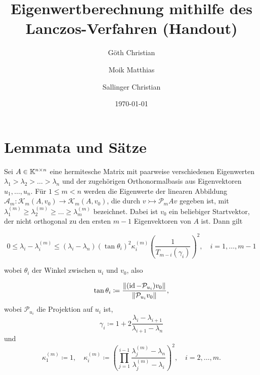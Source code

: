 \documentclass{article}
\begin{document}
\title
{
	Eigenwertberechnung mithilfe des Lanczos-Verfahren (Handout)
}
\author
{
	Göth Christian
	\and
	Moik Matthias
	\and
	Sallinger Christian
}
\date{\today}
\maketitle


\section{Lemmata und Sätze}

\begin{theorem}
	Sei $A \in \mathbb{K}^{n \times n}$ eine hermitesche Matrix mit paarweise verschiedenen Eigenwerten $\lambda_1 > \lambda_2 > \dots > \lambda_n$ und der zugehörigen Orthonormalbasis aus Eigenvektoren $u_1,\dots,u_n$. Für $1 \le m < n$ werden die Eigenwerte der linearen Abbildung $\mathcal{A}_m: \mathcal{K}_m(A,v_0)\rightarrow \mathcal{K}_m(A,v_0)$, die durch $v \rightarrowtail \mathcal{P}_mAv$ gegeben ist,  mit $\lambda_1^{(m)} \ge \lambda_2^{(m)} \ge \dots \ge \lambda_m^{(m)}$ bezeichnet. Dabei ist $v_0$ ein beliebiger Startvektor, der nicht orthogonal zu den ersten $m-1$ Eigenvektoren von $A$ ist. Dann gilt
	
	\begin{equation}
		\label{konvergenz Eigenwerte}
		0 \le \lambda_i - \lambda_i^{(m)} \le (\lambda_i -\lambda_n) (\tan\theta_i)^2 \kappa_i^{(m)} \left(\frac{1}{T_{m-i}(\gamma_i)}\right)^2, \quad i=1,\dots,m-1
	\end{equation}
	
	wobei $\theta_i$ der Winkel zwischen $u_i$ und $v_0$, also
	
	\begin{equation*}
		\tan \theta_i \coloneqq \frac{{\left \| (\operatorname{id} - \mathcal{P}_{u_i})v_0 \right \|}_{}}{{\left \|  \mathcal{P}_{u_i}v_0 \right \|}_{}},
	\end{equation*}
	wobei $\mathcal{P}_{u_i}$ die Projektion auf $u_i$ ist,
	\begin{equation*}
		\gamma_i \coloneqq 1+2 \frac{\lambda_i-\lambda_{i+1}}{\lambda_{i+1} -\lambda_n}
	\end{equation*}
	und
	\begin{equation*}
		\kappa_1^{(m)} \coloneqq 1, \quad \kappa_i^{(m)} \coloneqq \left(\prod_{j=1}^{i-1} \frac{\lambda_j^{(m)} - \lambda_n}{\lambda_j^{(m)} - \lambda_i}\right)^2, \quad i = 2,\dots,m.
	\end{equation*}
\end{theorem}
\end{document}
